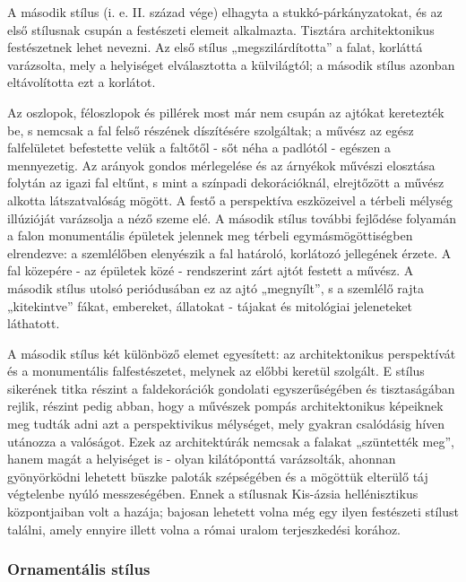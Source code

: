 A második stílus (i. e. II. század vége) elhagyta a stukkó-párkányzatokat, és az első
stílusnak csupán a festészeti elemeit alkalmazta. Tisztára architektonikus festészetnek
lehet nevezni. Az első stílus „megszilárdította” a falat, korláttá varázsolta, mely a
helyiséget elválasztotta a külvilágtól; a második stílus azonban eltávolította ezt a korlátot.

Az oszlopok, féloszlopok és pillérek most már nem csupán az ajtókat keretezték be, s
nemcsak a fal felső részének díszítésére szolgáltak; a művész az egész falfelületet
befestette velük a faltőtől - sőt néha a padlótól - egészen a mennyezetig.
Az arányok gondos mérlegelése és az árnyékok művészi elosztása folytán az igazi fal
eltűnt, s mint a színpadi dekorációknál, elrejtőzött a művész alkotta látszatvalóság
mögött. A festő a perspektíva eszközeivel a térbeli mélység illúzióját varázsolja a néző
szeme elé. A második stílus további fejlődése folyamán a falon monumentális épületek
jelennek meg térbeli egymásmögöttiségben elrendezve: a szemlélőben elenyészik a fal
határoló, korlátozó jellegének érzete. A fal közepére - az épületek közé - rendszerint zárt ajtót festett a művész. A második stílus utolsó periódusában ez az ajtó „megnyílt”, s a szemlélő rajta „kitekintve” fákat, embereket, állatokat - tájakat és mitológiai jeleneteket
láthatott.

A második stílus két különböző elemet egyesített: az architektonikus perspektívát és a
monumentális falfestészetet, melynek az előbbi keretül szolgált. E stílus sikerének titka
részint a faldekorációk gondolati egyszerűségében és tisztaságában rejlik, részint pedig
abban, hogy a művészek pompás architektonikus képeiknek meg tudták adni azt a 
perspektivikus mélységet, mely gyakran csalódásig híven utánozza a valóságot. Ezek az
architektúrák nemcsak a falakat „szüntették meg”, hanem magát a helyiséget is - olyan
kilátóponttá varázsolták, ahonnan gyönyörködni lehetett büszke paloták szépségében és a
mögöttük elterülő táj végtelenbe nyúló messzeségében. Ennek a stílusnak Kis-ázsia
hellénisztikus központjaiban volt a hazája; bajosan lehetett volna még egy ilyen festészeti
stílust találni, amely ennyire illett volna a római uralom terjeszkedési korához.

\subsubsection{Ornamentális stílus}

